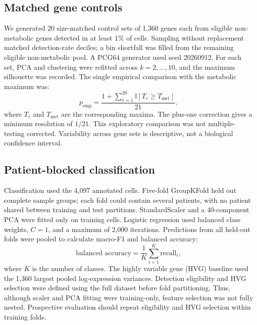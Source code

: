 \subsection{Matched gene controls}
We generated 20 size-matched control sets of 1,360 genes each from eligible non-metabolic genes detected in at least 1\% of cells. Sampling without replacement matched detection-rate deciles; a bin shortfall was filled from the remaining eligible non-metabolic pool. A PCG64 generator used seed 20260912. For each set, PCA and clustering were refitted across $k=2,\ldots,10$, and the maximum silhouette was recorded. The single empirical comparison with the metabolic maximum was:
\begin{equation}
p_{\text{emp}} = \frac{1 + \sum_{r=1}^{20} \mathbb{I}[T_r \ge T_{\text{met}}]}{21},
\end{equation}
where $T_r$ and $T_{\text{met}}$ are the corresponding maxima. The plus-one correction gives a minimum resolution of $1/21$. This exploratory comparison was not multiple-testing corrected. Variability across gene sets is descriptive, not a biological confidence interval.

\subsection{Patient-blocked classification}
Classification used the 4,097 annotated cells. Five-fold GroupKFold held out complete sample groups; each fold could contain several patients, with no patient shared between training and test partitions. StandardScaler and a 40-component PCA were fitted only on training cells. Logistic regression used balanced class weights, $C=1$, and a maximum of 2,000 iterations. Predictions from all held-out folds were pooled to calculate macro-F1 and balanced accuracy:
\begin{equation}
\text{balanced accuracy} = \frac{1}{K} \sum_{i=1}^{K} \text{recall}_i,
\end{equation}
where $K$ is the number of classes. The highly variable gene (HVG) baseline used the 1,360 largest pooled log-expression variances. Detection eligibility and HVG selection were defined using the full dataset before fold partitioning. Thus, although scaler and PCA fitting were training-only, feature selection was not fully nested. Prospective evaluation should repeat eligibility and HVG selection within training folds.
